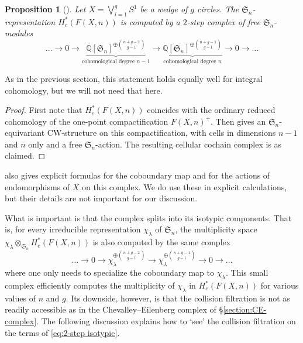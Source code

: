 \documentclass[12pt]{article}
\newcommand{\Q}{\mathbb{Q}}
\newcommand{\SymGroup}[1][n]{\mathfrak{S}_{#1}}
\newcommand{\Specht}[1]{\chi_{#1}}
\theoremstyle{plain}
\newtheorem{prop}[thm]{Proposition}
\theoremstyle{definition}
\theoremstyle{remark}
\begin{document}
\begin{prop}[{\cite[Theorem 1.2]{BCGY21}}]\label{prop:2-step}
    Let $X= \bigvee_{i=1}^g S^1$ be a wedge of $g$ circles. The $\SymGroup$-representation $H^*_c(F(X,n))$ is computed by a $2$-step complex of free $\SymGroup$-modules
    \begin{equation} \label{eq:2-step integral}
        \ldots \to 0\to \underbrace{\Q[\SymGroup]^{\oplus\binom{n+g-2}{g-1}}}_{\text{cohomological degree }n-1} \to \underbrace{\Q[\SymGroup]^{\oplus\binom{n+g-1}{g-1}}}_{\text{cohomological degree }n} \to 0 \to \ldots
    \end{equation}
\end{prop}

As in the previous section, this statement holds equally well for integral cohomology, but we will not need that here.
\begin{proof}
    First note that $H^*_c(F(X,n))$ coincides with the ordinary reduced cohomology of the one-point compactification $F(X,n)^+$. Then \cite{BCGY21} gives an $\SymGroup$-equivariant CW-structure on this compactification, with cells in dimensions $n-1$ and $n$ only and a free $\SymGroup$-action. The resulting cellular cochain complex is as claimed.
\end{proof}

\cite{BCGY21} also gives explicit formulas for the coboundary map and for the actions of endomorphisms of $X$ on this complex. We do use these in explicit calculations, but their details are not important for our discussion.

What is important is that the complex splits into its isotypic components. That is, for every irreducible representation $\Specht{\lambda}$ of $\SymGroup$, the multiplicity space $ \Specht{\lambda}\otimes_{\SymGroup} H^*_c(F(X,n))$ is also computed by the same complex
\begin{equation} \label{eq:2-step isotypic}
    \ldots\to 0 \to \Specht{\lambda}^{\oplus\binom{n+g-2}{g-1}} \to \Specht{\lambda}^{\oplus\binom{n+g-1}{g-1}} \to 0 \to \ldots
\end{equation}
where one only needs to specialize the coboundary map to $\Specht{\lambda}$.
This small complex efficiently computes the multiplicity of $\Specht{\lambda}$ in $H^*_c(F(X,n))$ for various values of $n$ and $g$. Its downside, however, is that the collision filtration is not as readily accessible as in the Chevalley--Eilenberg complex of \S\ref{section:CE-complex}. The following discussion explains how to `see' the collision filtration on the terms of \eqref{eq:2-step isotypic}.
\end{document}

